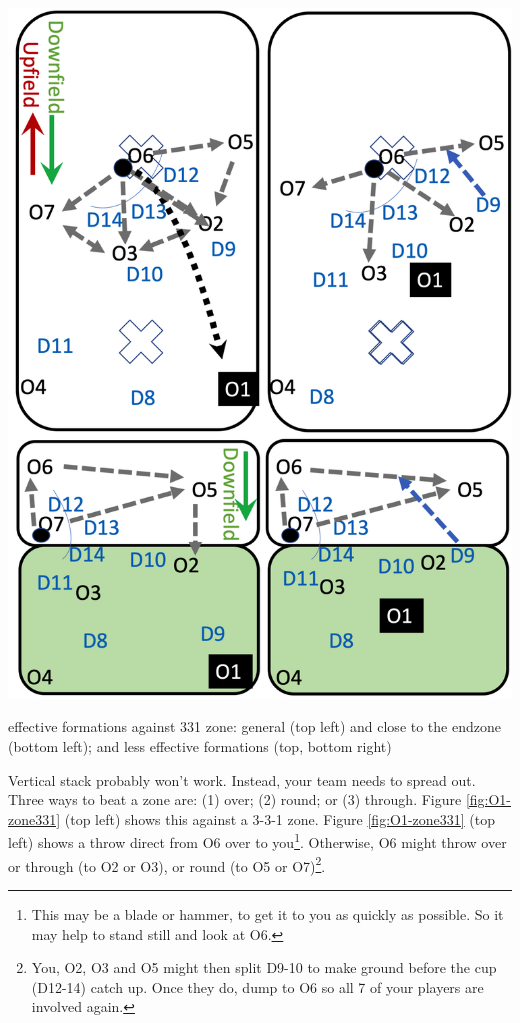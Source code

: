 \documentclass{tufte-handout}
\begin{document}
\begin{marginfigure}%
  \includegraphics[width=\linewidth]{O1-zone331}
  \caption{effective formations against 331 zone: 
  general (top left)
  and close to the endzone (bottom left); and 
  less effective formations (top, bottom right)}
  \label{fig:O1-zone331}
\end{marginfigure}

Vertical stack 
probably won't work. 
Instead, your 
team needs to 
spread out. 
Three ways to beat a zone are:
(1) over;
(2) round; or
(3) through. 
Figure \ref{fig:O1-zone331}
(top left)
shows this 
against a 
3-3-1 zone. 
Figure \ref{fig:O1-zone331} (top left)
shows a throw 
direct 
from O6 
over to you\footnote{
This may be a 
blade or
hammer, 
to get it 
to you
as quickly as possible.
So it may help to 
stand still 
and look at O6.}.
Otherwise, 
O6 might throw
over or through (to O2 or O3), 
or round (to O5 or O7)\footnote{
You, 
O2, 
O3 and
O5
might then split
D9-10
to make ground 
before the cup 
(D12-14) catch up. 
Once they do, 
dump to O6 
so all 7 of your players
are involved again.}. 
\end{document}
